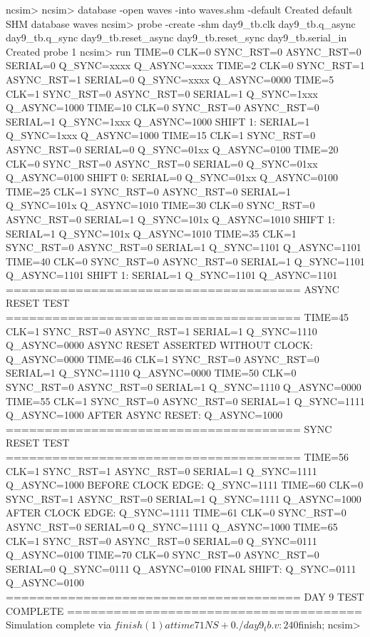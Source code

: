 ncsim> 
ncsim> database -open waves -into waves.shm -default
Created default SHM database waves
ncsim> probe -create -shm day9_tb.clk day9_tb.q_async day9_tb.q_sync day9_tb.reset_async day9_tb.reset_sync day9_tb.serial_in
Created probe 1
ncsim> run
TIME=0 CLK=0 SYNC_RST=0 ASYNC_RST=0 SERIAL=0 Q_SYNC=xxxx Q_ASYNC=xxxx
TIME=2 CLK=0 SYNC_RST=1 ASYNC_RST=1 SERIAL=0 Q_SYNC=xxxx Q_ASYNC=0000
TIME=5 CLK=1 SYNC_RST=0 ASYNC_RST=0 SERIAL=1 Q_SYNC=1xxx Q_ASYNC=1000
TIME=10 CLK=0 SYNC_RST=0 ASYNC_RST=0 SERIAL=1 Q_SYNC=1xxx Q_ASYNC=1000
SHIFT 1: SERIAL=1 Q_SYNC=1xxx Q_ASYNC=1000
TIME=15 CLK=1 SYNC_RST=0 ASYNC_RST=0 SERIAL=0 Q_SYNC=01xx Q_ASYNC=0100
TIME=20 CLK=0 SYNC_RST=0 ASYNC_RST=0 SERIAL=0 Q_SYNC=01xx Q_ASYNC=0100
SHIFT 0: SERIAL=0 Q_SYNC=01xx Q_ASYNC=0100
TIME=25 CLK=1 SYNC_RST=0 ASYNC_RST=0 SERIAL=1 Q_SYNC=101x Q_ASYNC=1010
TIME=30 CLK=0 SYNC_RST=0 ASYNC_RST=0 SERIAL=1 Q_SYNC=101x Q_ASYNC=1010
SHIFT 1: SERIAL=1 Q_SYNC=101x Q_ASYNC=1010
TIME=35 CLK=1 SYNC_RST=0 ASYNC_RST=0 SERIAL=1 Q_SYNC=1101 Q_ASYNC=1101
TIME=40 CLK=0 SYNC_RST=0 ASYNC_RST=0 SERIAL=1 Q_SYNC=1101 Q_ASYNC=1101
SHIFT 1: SERIAL=1 Q_SYNC=1101 Q_ASYNC=1101
======================================
ASYNC RESET TEST
======================================
TIME=45 CLK=1 SYNC_RST=0 ASYNC_RST=1 SERIAL=1 Q_SYNC=1110 Q_ASYNC=0000
ASYNC RESET ASSERTED WITHOUT CLOCK: Q_ASYNC=0000
TIME=46 CLK=1 SYNC_RST=0 ASYNC_RST=0 SERIAL=1 Q_SYNC=1110 Q_ASYNC=0000
TIME=50 CLK=0 SYNC_RST=0 ASYNC_RST=0 SERIAL=1 Q_SYNC=1110 Q_ASYNC=0000
TIME=55 CLK=1 SYNC_RST=0 ASYNC_RST=0 SERIAL=1 Q_SYNC=1111 Q_ASYNC=1000
AFTER ASYNC RESET: Q_ASYNC=1000
======================================
SYNC RESET TEST
======================================
TIME=56 CLK=1 SYNC_RST=1 ASYNC_RST=0 SERIAL=1 Q_SYNC=1111 Q_ASYNC=1000
BEFORE CLOCK EDGE: Q_SYNC=1111
TIME=60 CLK=0 SYNC_RST=1 ASYNC_RST=0 SERIAL=1 Q_SYNC=1111 Q_ASYNC=1000
AFTER CLOCK EDGE: Q_SYNC=1111
TIME=61 CLK=0 SYNC_RST=0 ASYNC_RST=0 SERIAL=0 Q_SYNC=1111 Q_ASYNC=1000
TIME=65 CLK=1 SYNC_RST=0 ASYNC_RST=0 SERIAL=0 Q_SYNC=0111 Q_ASYNC=0100
TIME=70 CLK=0 SYNC_RST=0 ASYNC_RST=0 SERIAL=0 Q_SYNC=0111 Q_ASYNC=0100
FINAL SHIFT: Q_SYNC=0111 Q_ASYNC=0100
======================================
DAY 9 TEST COMPLETE
======================================
Simulation complete via $finish(1) at time 71 NS + 0
./day9_tb.v:240         $finish;
ncsim> 
